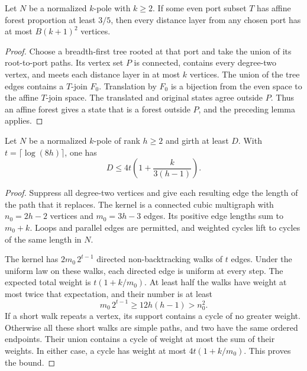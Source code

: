 \begin{lemma}
\label{lem:path-qualitative-affine-width}
Let $N$ be a normalized $k$-pole with $k\ge2$.
If some even port subset $T$ has affine forest proportion at least $3/5$, then every distance layer from any chosen port has at most $B(k+1)^2$ vertices.
\end{lemma}

\begin{proof}
Choose a breadth-first tree rooted at that port and take the union of its root-to-port paths.
Its vertex set $P$ is connected, contains every degree-two vertex, and meets each distance layer in at most $k$ vertices.
The union of the tree edges contains a $T$-join $F_0$.
Translation by $F_0$ is a bijection from the even space to the affine $T$-join space.
The translated and original states agree outside $P$.
Thus an affine forest gives a state that is a forest outside $P$, and the preceding lemma applies.
\end{proof}

\begin{lemma}
\label{lem:path-qualitative-weighted-moore}
Let $N$ be a normalized $k$-pole of rank $h\ge2$ and girth at least $D$.
With $t=\lceil\log(8h)\rceil$, one has
\[
 D\le4t\left(1+\frac{k}{3(h-1)}\right).
\]
\end{lemma}

\begin{proof}
Suppress all degree-two vertices and give each resulting edge the length of the path that it replaces.
The kernel is a connected cubic multigraph with
$n_0=2h-2$ vertices and $m_0=3h-3$ edges.
Its positive edge lengths sum to $m_0+k$.
Loops and parallel edges are permitted, and weighted cycles lift to cycles of the same length in $N$.

The kernel has $2m_0\,2^{t-1}$ directed non-backtracking walks of $t$ edges.
Under the uniform law on these walks, each directed edge is uniform at every step.
The expected total weight is $t(1+k/m_0)$.
At least half the walks have weight at most twice that expectation, and their number is at least
\[
 m_0\,2^{t-1}\ge12h(h-1)>n_0^2.
\]
If a short walk repeats a vertex, its support contains a cycle of no greater weight.
Otherwise all these short walks are simple paths, and two have the same ordered endpoints.
Their union contains a cycle of weight at most the sum of their weights.
In either case, a cycle has weight at most $4t(1+k/m_0)$.
This proves the bound.
\end{proof}

